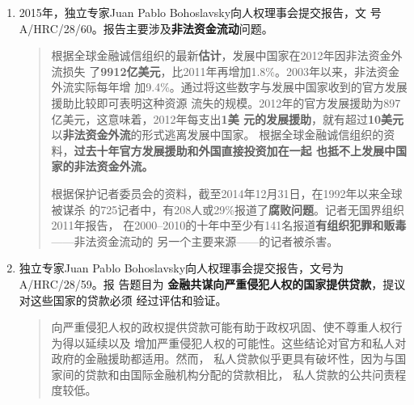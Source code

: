 \begin{enumerate}
\item 2015年，独立专家Juan Pablo Bohoslavsky向人权理事会提交报告，文
  号A/HRC/28/60。报告主要涉及\textbf{非法资金流动}问题。
  \begin{quotation}
    根据全球金融诚信组织的最新\textbf{估计}，发展中国家在2012年因非法资金外流损失
    了\textbf{9912亿美元}，比2011年再增加1.8\%。2003年以来，非法资金外流实际每年增
    加9.4\%。通过将这些数字与发展中国家收到的官方发展援助比较即可表明这种资源
    流失的规模。2012年的官方发展援助为897亿美元，这意味着，2012年每支出\textbf{1美
      元的发展援助}，就有超过\textbf{10美元}以\textbf{非法资金外流}的形式逃离发展中国家。
    根据全球金融诚信组织的资料，\textbf{过去十年官方发展援助和外国直接投资加在一起
      也抵不上发展中国家的非法资金外流。}

    根据保护记者委员会的资料，截至2014年12月31日，在1992年以来全球被谋杀
    的725记者中，有208人或29\%报道了\textbf{腐败问题}。记者无国界组织2011年报告，
    在2000--2010的十年中至少有141名报道\textbf{有组织犯罪和贩毒}——非法资金流动的
    另一个主要来源——的记者被杀害。
  \end{quotation}

\item 独立专家Juan Pablo Bohoslavsky向人权理事会提交报告，文号为A/HRC/28/59。报
  告题目为 \textbf{金融共谋向严重侵犯人权的国家提供贷款}，提议对这些国家的贷款必须
  经过评估和验证。
  \begin{quotation}
    向严重侵犯人权的政权提供贷款可能有助于政权巩固、使不尊重人权行为得以延续以及
    增加严重侵犯人权的可能性。这些结论对官方和私人对政府的金融援助都适用。然而，
    私人贷款似乎更具有破坏性，因为与国家间的贷款和由国际金融机构分配的贷款相比，
    私人贷款的公共问责程度较低。
  \end{quotation}


\end{enumerate}



